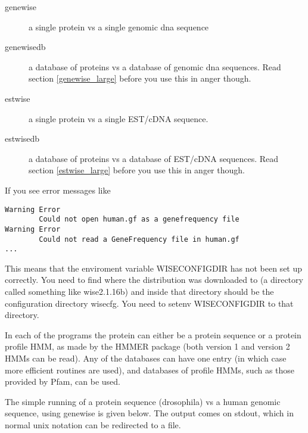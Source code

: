 \documentclass{article}
\begin{document}
\begin{description}
\item[genewise] a single protein vs a single genomic dna sequence
\item[genewisedb] a database of proteins vs a database of genomic dna sequences. Read
section \ref{genewise_large} before you use this in anger though.
\item[estwise] a single protein vs a single EST/cDNA sequence. 
\item[estwisedb] a database of proteins vs a database of EST/cDNA sequences. Read
section \ref{estwise_large} before you use this in anger though.
\end{description}

If you see error messages like
\begin{verbatim}
Warning Error
        Could not open human.gf as a genefrequency file
Warning Error
        Could not read a GeneFrequency file in human.gf
...
\end{verbatim}
This means that the enviroment variable WISECONFIGDIR has not been
set up correctly. You need to find where the distribution was downloaded
to (a directory called something like wise2.1.16b) and inside that
directory should be the configuration directory wisecfg. You need to
setenv WISECONFIGDIR to that directory.

In each of the programs the protein can either be a protein sequence
or a protein profile HMM, as made by the HMMER package (both version 1
and version 2 HMMs can be read). Any of the databases can have one
entry (in which case more efficient routines are used), and databases
of profile HMMs, such as those provided by Pfam, can be used.

The simple running of a protein sequence (drosophila) vs a human genomic sequence,
using genewise is given below. The output comes on stdout, which in normal unix
notation can be redirected to a file.
\end{document}
